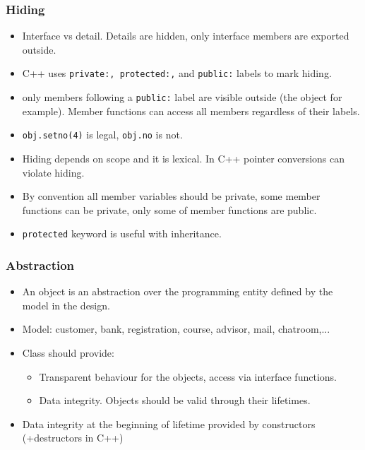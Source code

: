 \begin{frame}
\frametitle{Hiding}
\begin{itemize}
\item Interface vs detail. Details are hidden, only interface members are exported outside.
\item C++ uses \lstinline!private:, protected:,! and \lstinline!public:! labels to mark hiding.
\item only members following a \lstinline!public:! label are visible outside (the object for
example). Member functions can access all members regardless of their labels.
\item \lstinline!obj.setno(4)! is legal, \lstinline!obj.no! is not.
\item Hiding depends on scope and it is lexical. In C++ pointer conversions can violate hiding.
\item By convention all member variables should be private, some member functions
	can be private, only some of member functions are public.
\item \lstinline!protected! keyword is useful with inheritance.
\end{itemize}
\end{frame}

\begin{frame}
\frametitle{Abstraction}
\begin{itemize}
\item An object is an abstraction over the programming entity defined by the model in the
design.
\item Model: customer, bank, registration, course, advisor, mail, chatroom,...
\item Class should provide:
\begin{itemize}
\item Transparent behaviour for the objects, access via interface functions.
\item Data integrity. Objects should be valid through their lifetimes.
\end{itemize}
\item Data integrity at the beginning of lifetime provided by constructors (+destructors in C++)
\end{itemize}
\end{frame}

